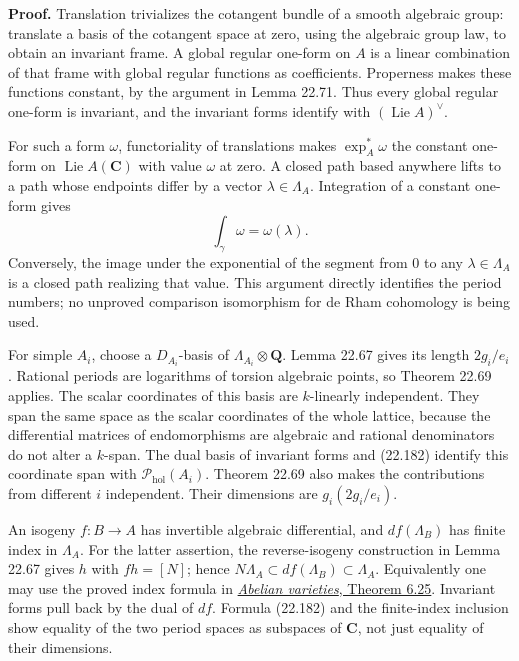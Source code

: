 \documentclass[
  11pt,
  a4paper,
]{article}
\begin{document}
\textbf{Proof.} Translation trivializes the cotangent bundle of a smooth
algebraic group: translate a basis of the cotangent space at zero, using
the algebraic group law, to obtain an invariant frame. A global regular
one-form on \(A\) is a linear combination of that frame with global
regular functions as coefficients. Properness makes these functions
constant, by the argument in Lemma 22.71. Thus every global regular
one-form is invariant, and the invariant forms identify with
\((\operatorname{Lie}A)^\vee\).

For such a form \(\omega\), functoriality of translations makes
\(\exp_A^*\omega\) the constant one-form on
\(\operatorname{Lie}A(\mathbf C)\) with value \(\omega\) at zero. A
closed path based anywhere lifts to a path whose endpoints differ by a
vector \(\lambda\in\Lambda_A\). Integration of a constant one-form gives
\[
 \int_\gamma\omega=\omega(\lambda).
 \tag{22.182}
\] Conversely, the image under the exponential of the segment from \(0\)
to any \(\lambda\in\Lambda_A\) is a closed path realizing that value.
This argument directly identifies the period numbers; no unproved
comparison isomorphism for de Rham cohomology is being used.

For simple \(A_i\), choose a \(D_{A_i}\)-basis of
\(\Lambda_{A_i}\otimes\mathbf Q\). Lemma 22.67 gives its length
\(2g_i/e_i\). Rational periods are logarithms of torsion algebraic
points, so Theorem 22.69 applies. The scalar coordinates of this basis
are \(k\)-linearly independent. They span the same space as the scalar
coordinates of the whole lattice, because the differential matrices of
endomorphisms are algebraic and rational denominators do not alter a
\(k\)-span. The dual basis of invariant forms and (22.182) identify this
coordinate span with \(\mathcal P_{\mathrm{hol}}(A_i)\). Theorem 22.69
also makes the contributions from different \(i\) independent. Their
dimensions are \(g_i(2g_i/e_i)\).

An isogeny \(f:B\to A\) has invertible algebraic differential, and
\(df(\Lambda_B)\) has finite index in \(\Lambda_A\). For the latter
assertion, the reverse-isogeny construction in Lemma 22.67 gives \(h\)
with \(fh=[N]\); hence
\(N\Lambda_A\subset df(\Lambda_B)\subset\Lambda_A\). Equivalently one
may use the proved index formula in
\href{https://github.com/KokunoYumeto/open-math-courses-public/blob/146dc81802e69cf262fb6cc65c1b9f74e71f4625/docs/courses/AG-GS/src/abelian-varieties.md\#homomorphisms-isogenies-and-rational-lattices}{\emph{Abelian
varieties}, Theorem 6.25}. Invariant forms pull back by the dual of
\(df\). Formula (22.182) and the finite-index inclusion show equality of
the two period spaces as subspaces of \(\mathbf C\), not just equality
of their dimensions.
\end{document}
